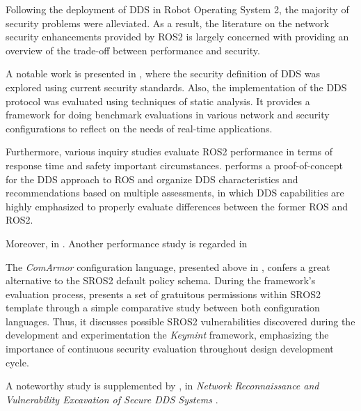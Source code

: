 Following the deployment of DDS in Robot Operating System 2, the majority of security problems were alleviated. As a result, the literature on the network security enhancements provided by ROS2 is largely concerned with providing an overview of the trade-off between performance and security. 

A notable work is presented in , where the security definition of DDS was explored using current security standards. Also, the implementation of the DDS protocol was evaluated using techniques of static analysis. It provides a framework for doing benchmark evaluations in various network and security configurations to reflect on the needs of real-time applications.

Furthermore, various inquiry studies evaluate ROS2 performance in terms of response time and safety important circumstances. \citeauthor*{maruyama2016exploring} performs a proof-of-concept for the DDS approach to ROS and organize DDS characteristics and recommendations based on multiple assessments, in which DDS capabilities are highly emphasized to properly evaluate differences between the former ROS and ROS2. 

Moreover, in . Another performance study is regarded in 


The \textit{ComArmor} configuration language, presented above in , confers a great alternative to the SROS2 default policy schema. During the framework's evaluation process, \citeauthor{white2018procedurally} presents a set of gratuitous permissions within SROS2 template through a simple comparative study between both configuration languages. Thus, it discusses possible SROS2 vulnerabilities discovered during the development and experimentation the \textit{Keymint} framework, emphasizing the importance of continuous security evaluation throughout design development cycle.

A noteworthy study is supplemented by \citeauthor*{white2019network}, in \textit{Network Reconnaissance and Vulnerability Excavation of Secure DDS Systems} \cite{white2019network}. 






